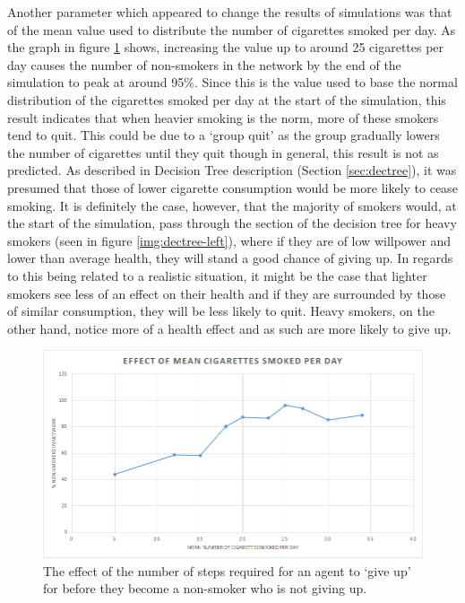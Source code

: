 \documentclass[]{report}
\begin{document}
Another parameter which appeared to change the results of simulations was that of the mean value used to distribute the number of cigarettes smoked per day. As the graph in figure \ref{img:mean-cig} shows, increasing the value up to around 25 cigarettes per day causes the number of non-smokers in the network by the end of the simulation to peak at around 95\%. Since this is the value used to base the normal distribution of the cigarettes smoked per day at the start of the simulation, this result indicates that when heavier smoking is the norm, more of these smokers tend to quit. This could be due to a `group quit' as the group gradually lowers the number of cigarettes until they quit though in general, this result is not as predicted. As described in Decision Tree description (Section \ref{sec:dectree}), it was presumed that those of lower cigarette consumption would be more likely to cease smoking. It is definitely the case, however, that the majority of smokers would, at the start of the simulation, pass through the section of the decision tree for heavy smokers (seen in figure \ref{img:dectree-left}), where if they are of low willpower and lower than average health, they will stand a good chance of giving up. In regards to this being related to a realistic situation, it might be the case that lighter smokers see less of an effect on their health and if they are surrounded by those of similar consumption, they will be less likely to quit. Heavy smokers, on the other hand, notice more of a health effect and as such are more likely to give up.

\begin{figure}
\label{img:mean-cig}
\begin{center}
\includegraphics[scale=0.5]{mean-cig.png}
\end{center}
\caption{The effect of the number of steps required for an agent to `give up' for before they become a non-smoker who is not giving up.}
\end{figure}
\end{document}
